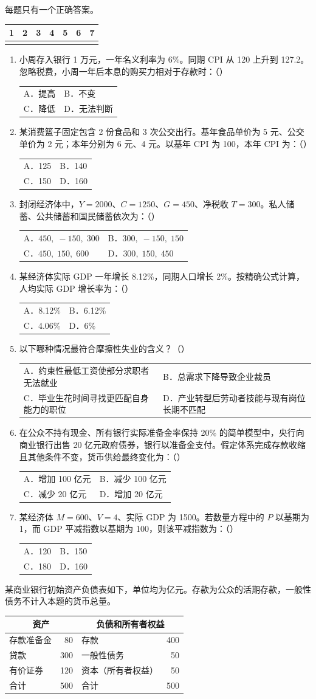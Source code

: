 \documentclass[UTF8,11pt,a4paper,fontset=fandol]{ctexart}
\makeatletter
\newcommand{\sect}[1]{\par\vspace{0.7em}{\large\bfseries #1}\par\vspace{0.6em}}
\newcommand{\choices}[4]{\par\nopagebreak\begin{tabularx}{\linewidth}{@{}XX@{}}A．#1&B．#2\\C．#3&D．#4\end{tabularx}\par}
\makeatother
\begin{document}
\newpage\sect{二、单选题（每题 4 分，共 28 分）}每题只有一个正确答案。
\par\smallskip\begin{tabularx}{\linewidth}{|*{7}{Y|}}&2&3&4&5&6&7\\\hline
\rule{0pt}{2.0em}&&&&&&\\\hline
\end{tabularx}\par\smallskip
\begin{enumerate}[label=\arabic*.,leftmargin=*,itemsep=0.85em,topsep=0.3em]
\item 小周存入银行 1 万元，一年名义利率为 6\%。同期 CPI 从 120 上升到 127.2。忽略税费，小周一年后本息的购买力相对于存款时：（\quad）
\choices{提高}{不变}{降低}{无法判断}
\item 某消费篮子固定包含 2 份食品和 3 次公交出行。基年食品单价为 5 元、公交单价为 2 元；本年分别为 6 元、4 元。以基年 CPI 为 100，本年 CPI 为：（\quad）
\choices{125}{140}{150}{160}
\item 封闭经济体中，$Y=2000$、$C=1250$、$G=450$、净税收 $T=300$。私人储蓄、公共储蓄和国民储蓄依次为：（\quad）
\choices{$450,\;-150,\;300$}{$300,\;-150,\;150$}{$450,\;150,\;600$}{$300,\;150,\;450$}
\item 某经济体实际 GDP 一年增长 8.12\%，同期人口增长 2\%。按精确公式计算，人均实际 GDP 增长率为：（\quad）
\choices{8.12\%}{6.12\%}{4.06\%}{6\%}
\item 以下哪种情况最符合摩擦性失业的含义？（\quad）
\choices{约束性最低工资使部分求职者无法就业}{总需求下降导致企业裁员}{毕业生花时间寻找更匹配自身能力的职位}{产业转型后劳动者技能与现有岗位长期不匹配}
\item 在公众不持有现金、所有银行实际准备金率保持 20\% 的简单模型中，央行向商业银行出售 20 亿元政府债券，银行以准备金支付。假定体系完成存款收缩且其他条件不变，货币供给最终变化为：（\quad）
\choices{增加 100 亿元}{减少 100 亿元}{减少 20 亿元}{增加 20 亿元}
\item 某经济体 $M=600$、$V=4$、实际 GDP 为 1500。若数量方程中的 $P$ 以基期为 1，而 GDP 平减指数以基期为 100，则该平减指数为：（\quad）
\choices{120}{150}{180}{160}
\end{enumerate}
\newpage\sect{三、计算题（1 题，共 20 分）}
某商业银行初始资产负债表如下，单位均为亿元。存款为公众的活期存款，一般性债务不计入本题的货币总量。
\begin{center}\renewcommand{\arraystretch}{1.35}
\begin{tabularx}{0.9\linewidth}{|X|r|X|r|}\hline
\multicolumn{2}{|c|}{资产}&\multicolumn{2}{c|}{负债和所有者权益}\\\hline
存款准备金&80&存款&400\\\hline
贷款&300&一般性债务&50\\\hline
有价证券&120&资本（所有者权益）&50\\\hline
合计&500&合计&500\\\hline
\end{tabularx}\end{center}
\end{document}
